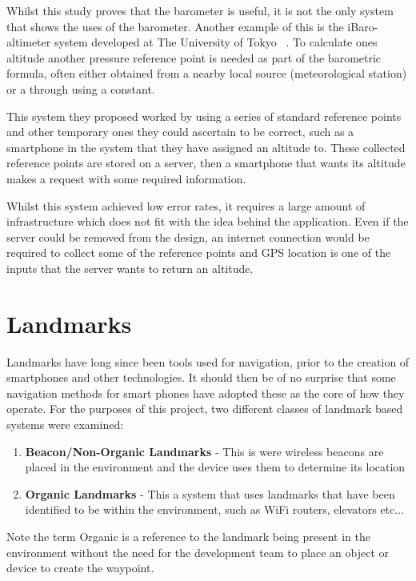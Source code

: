 \documentclass[main.tex]{subfiles}
\begin{document}
Whilst this study proves that the barometer is useful, it is not the only system that shows the uses of the barometer. Another example of this is the iBaro-altimeter system developed at The University of Tokyo ~\cite{baro22014}. To calculate ones altitude another pressure reference point is needed as part of the barometric formula, often either obtained from a nearby local source (meteorological station) or a through using a constant.

This system they proposed worked by using a series of standard reference points and other temporary ones they could ascertain to be correct, such as a smartphone in the system that they have assigned an altitude to. These collected reference points are stored on a server, then a smartphone that wants its altitude makes a request with some required information.

Whilst this system achieved low error rates, it requires a large amount of infrastructure which does not fit with the idea behind the application. Even if the server could be removed from the design, an internet connection would be required to collect some of the reference points and GPS location is one of the inputs that the server wants to return an altitude.

\section{Landmarks}

Landmarks have long since been tools used for navigation, prior to the creation of smartphones and other technologies. It should then be of no surprise that some navigation methods for smart phones have adopted these as the core of how they operate. For the purposes of this project, two different classes of landmark based systems were examined:

\begin{enumerate}
	\item \textbf{Beacon/Non-Organic Landmarks} - This is were wireless beacons are placed in the environment and the device uses them to determine its location
	\item \textbf{Organic Landmarks} - This a system that uses landmarks that have been identified to be within the environment, such as WiFi routers, elevators etc...
\end{enumerate}

Note the term Organic is a reference to the landmark being present in the environment without the need for the development team to place an object or device to create the waypoint.
\end{document}
